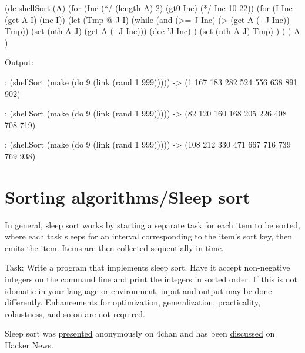 \begin{wideverbatim}

(de shellSort (A)
   (for (Inc (*/ (length A) 2)  (gt0 Inc)  (*/ Inc 10 22))
      (for (I Inc  (get A I)  (inc I))
         (let (Tmp @  J I)
            (while (and (>= J Inc) (> (get A (- J Inc)) Tmp))
               (set (nth A J) (get A (- J Inc)))
               (dec 'J Inc) )
            (set (nth A J) Tmp) ) ) )
   A )

Output:

: (shellSort (make (do 9 (link (rand 1 999)))))
-> (1 167 183 282 524 556 638 891 902)

: (shellSort (make (do 9 (link (rand 1 999)))))
-> (82 120 160 168 205 226 408 708 719)

: (shellSort (make (do 9 (link (rand 1 999)))))
-> (108 212 330 471 667 716 739 769 938)

\end{wideverbatim}

\pagebreak{}
\section*{Sorting algorithms/Sleep sort}

In general, sleep sort works by starting a separate task for each item
to be sorted, where each task sleeps for an interval corresponding to
the item's sort key, then emits the item. Items are then collected
sequentially in time.

Task: Write a program that implements sleep sort. Have it accept
non-negative integers on the command line and print the integers in
sorted order. If this is not idomatic in your language or environment,
input and output may be done differently. Enhancements for optimization,
generalization, practicality, robustness, and so on are not required.

Sleep sort was
\href{http://dis.4chan.org/read/prog/1295544154}{presented} anonymously
on 4chan and has been
\href{http://news.ycombinator.com/item?id=2657277}{discussed} on Hacker
News.


